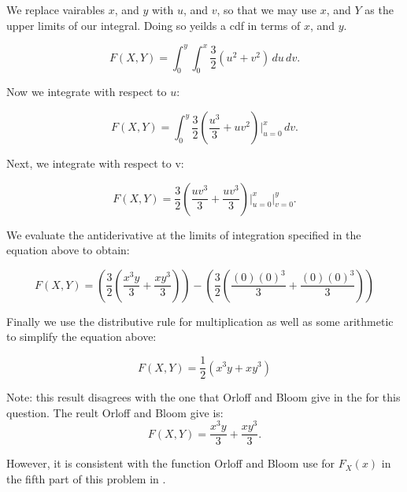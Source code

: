 \documentclass[a4paper,11pt]{article}
\begin{document}
We replace vairables $x$, and $y$ with $u$, and $v$, so that we may use
$x$, and $Y$ as the upper limits of our integral.  Doing so yeilds a cdf in
terms of $x$, and $y$.


\begin{equation}
F\left( X, Y \right) = \int_0^y \int_0^x \frac{3}{2}\left( u^2
  + v^2 \right) \,du \,dv.
\end{equation}

Now we integrate with respect to $u$:

\begin{equation}
F\left( X, Y \right) = \int_0^y  \frac{3}{2}\left( \frac{u^3}{3}
  + uv^2 \right) \bigg\rvert_{u=0}^x \,dv.
\end{equation}

Next, we integrate with respect to v:

\begin{equation}
F\left( X, Y \right) =   \frac{3}{2}\left( \frac{uv^3}{3}
  + \frac{uv^3}{3} \right) \bigg\rvert_{u=0}^x \bigg\rvert_{v=0}^{y}.
\end{equation}

We evaluate the antiderivative at the limits of integration specified in the
equation above to obtain:


\begin{equation}
F\left( X, Y \right) =   \left( \frac{3}{2}\left( \frac{x^{3}y}{3}
  + \frac{xy^3}{3} \right)  \right) -
  \left( \frac{3}{2}\left( \frac{\left(0 \right) \left(0 \right)^3}{3}
  + \frac{\left(0 \right) \left( 0 \right) ^3}{3} \right)  \right)
\end{equation}

Finally we use the distributive rule for multiplication as well as some arithmetic
to simplify the equation above:

\begin{equation}
F\left( X, Y \right) =  \frac{1}{2}\left( x^{3}y + xy^3  \right)
\end{equation}

Note: this result disagrees with the one that Orloff and Bloom give in the
\cite{slides7Sol} for this question.  The reult Orloff and Bloom give is:
\begin{equation}
  F\left( X, Y \right) = \frac{x^3 y}{3} + \frac{x y^3}{3}.
\end{equation}

However, it is consistent with the function Orloff and Bloom use for
$F_{X} \left( x \right)$ in the fifth part of this problem in
\cite{slides7Sol}.
\end{document}
